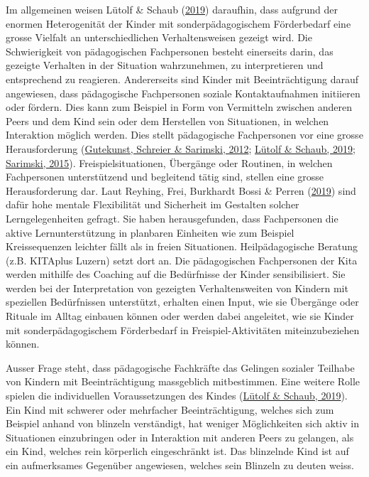 \documentclass[
  ngerman,
  11pt,
  paper=a4,
  twoside,
  titlepage=true,
  openright,
  abstract=on,
  toc=listofnumbered,
  numbers=noenddot,
  chapterprefix=true,
  headings=optiontohead,
  svgnames,
  dvipsnames]{scrreprt}
\begin{document}
Im allgemeinen weisen Lütolf \& Schaub
(\protect\hyperlink{ref-beobachtungsstudie}{2019}) daraufhin, dass
aufgrund der enormen Heterogenität der Kinder mit sonderpädagogischem
Förderbedarf eine grosse Vielfalt an unterschiedlichen Verhaltensweisen
gezeigt wird. Die Schwierigkeit von pädagogischen Fachpersonen besteht
einerseits darin, das gezeigte Verhalten in der Situation wahrzunehmen,
zu interpretieren und entsprechend zu reagieren. Andererseits sind
Kinder mit Beeinträchtigung darauf angewiesen, dass pädagogische
Fachpersonen soziale Kontaktaufnahmen initiieren oder fördern. Dies kann
zum Beispiel in Form von Vermitteln zwischen anderen Peers und dem Kind
sein oder dem Herstellen von Situationen, in welchen Interaktion möglich
werden. Dies stellt pädagogische Fachpersonen vor eine grosse
Herausforderung
(\protect\hyperlink{ref-schwerermehrfachbehinderung}{Gutekunst, Schreier
\& Sarimski, 2012}; \protect\hyperlink{ref-beobachtungsstudie}{Lütolf \&
Schaub, 2019};
\protect\hyperlink{ref-dabeiseinIstNichtAllesOderDoch}{Sarimski, 2015}).
Freispielsituationen, Übergänge oder Routinen, in welchen Fachpersonen
unterstützend und begleitend tätig sind, stellen eine grosse
Herausforderung dar. Laut Reyhing, Frei, Burkhardt Bossi \& Perren
(\protect\hyperlink{ref-fachkraftkindinteraktion}{2019}) sind dafür hohe
mentale Flexibilität und Sicherheit im Gestalten solcher
Lerngelegenheiten gefragt. Sie haben herausgefunden, dass Fachpersonen
die aktive Lernunterstützung in planbaren Einheiten wie zum Beispiel
Kreissequenzen leichter fällt als in freien Situationen.
Heilpädagogische Beratung (z.B. KITAplus Luzern) setzt dort an. Die
pädagogischen Fachpersonen der Kita werden mithilfe des Coaching auf die
Bedürfnisse der Kinder sensibilisiert. Sie werden bei der Interpretation
von gezeigten Verhaltensweiten von Kindern mit speziellen Bedürfnissen
unterstützt, erhalten einen Input, wie sie Übergänge oder Rituale im
Alltag einbauen können oder werden dabei angeleitet, wie sie Kinder mit
sonderpädagogischem Förderbedarf in Freispiel-Aktivitäten
miteinzubeziehen können.

Ausser Frage steht, dass pädagogische Fachkräfte das Gelingen sozialer
Teilhabe von Kindern mit Beeinträchtigung massgeblich mitbestimmen. Eine
weitere Rolle spielen die individuellen Voraussetzungen des Kindes
(\protect\hyperlink{ref-beobachtungsstudie}{Lütolf \& Schaub, 2019}).
Ein Kind mit schwerer oder mehrfacher Beeinträchtigung, welches sich zum
Beispiel anhand von blinzeln verständigt, hat weniger Möglichkeiten sich
aktiv in Situationen einzubringen oder in Interaktion mit anderen Peers
zu gelangen, als ein Kind, welches rein körperlich eingeschränkt ist.
Das blinzelnde Kind ist auf ein aufmerksames Gegenüber angewiesen,
welches sein Blinzeln zu deuten weiss.
\end{document}
